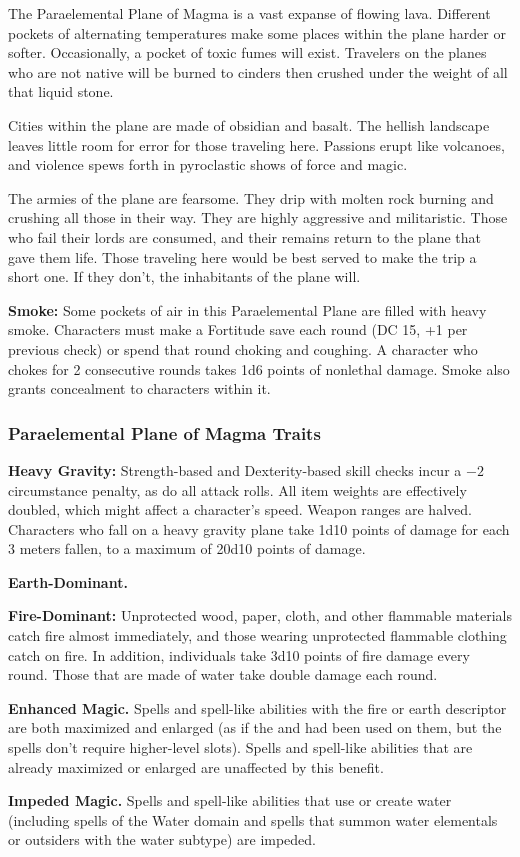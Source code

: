 The Paraelemental Plane of Magma is a vast expanse of flowing lava. Different pockets of alternating temperatures make some places within the plane harder or softer. Occasionally, a pocket of toxic fumes will exist. Travelers on the planes who are not native will be burned to cinders then crushed under the weight of all that liquid stone.

Cities within the plane are made of obsidian and basalt. The hellish landscape leaves little room for error for those traveling here. Passions erupt like volcanoes, and violence spews forth in pyroclastic shows of force and magic.
 
The armies of the plane are fearsome. They drip with molten rock burning and crushing all those in their way. They are highly aggressive and militaristic. Those who fail their lords are consumed, and their remains return to the plane that gave them life. Those traveling here would be best served to make the trip a short one. If they don't, the inhabitants of the plane will.

\textbf{Smoke:} Some pockets of air in this Paraelemental Plane are filled with heavy smoke. Characters must make a Fortitude save each round (DC 15, +1 per previous check) or spend that round choking and coughing. A character who chokes for 2 consecutive rounds takes 1d6 points of nonlethal damage. Smoke also grants concealment to characters within it.

\subsubsection{Paraelemental Plane of Magma Traits}
\begin{itemize*}
\item \textbf{Heavy Gravity:} Strength-based and Dexterity-based skill checks incur a $-2$ circumstance penalty, as do all attack rolls. All item weights are effectively doubled, which might affect a character's speed. Weapon ranges are halved. Characters who fall on a heavy gravity plane take 1d10 points of damage for each 3 meters fallen, to a maximum of 20d10 points of damage.
\item \textbf{Earth-Dominant.}
\item \textbf{Fire-Dominant:} Unprotected wood, paper, cloth, and other flammable materials catch fire almost immediately, and those wearing unprotected flammable clothing catch on fire. In addition, individuals take 3d10 points of fire damage every round. Those that are made of water take double damage each round.
\item \textbf{Enhanced Magic.} Spells and spell-like abilities with the fire or earth descriptor are both maximized and enlarged (as if the  and  had been used on them, but the spells don't require higher-level slots). Spells and spell-like abilities that are already maximized or enlarged are unaffected by this benefit.
\item \textbf{Impeded Magic.} Spells and spell-like abilities that use or create water (including spells of the Water domain and spells that summon water elementals or outsiders with the water subtype) are impeded.
\end{itemize*}
